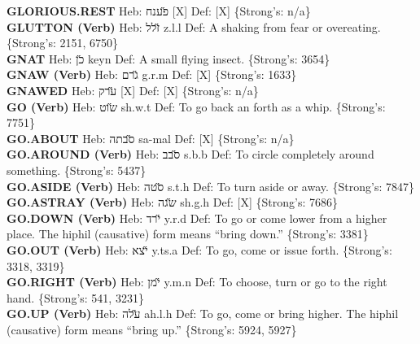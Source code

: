 {\textbf{GLORIOUS.REST} Heb: {\large\H פענח} {[}X{]} Def: {[}X{]} \{Strong's: n/a\}\hfill{}\\

\textbf{GLUTTON (Verb)} Heb: {\large\H זלל} z.l.l Def: A shaking from fear or overeating. \{Strong's: 2151, 6750\}\hfill{}\\

\textbf{GNAT} Heb: {\large\H כן} keyn Def: A small flying insect. \{Strong's: 3654\}\hfill{}\\

\textbf{GNAW (Verb)} Heb: {\large\H גרם} g.r.m Def: {[}X{]} \{Strong's: 1633\}\hfill{}\\

\textbf{GNAWED} Heb: {\large\H ערק} {[}X{]} Def: {[}X{]} \{Strong's: n/a\}\hfill{}\\

\textbf{GO (Verb)} Heb: {\large\H שוט} sh.w.t Def: To go back an forth as a whip. \{Strong's: 7751\}\hfill{}\\

\textbf{GO.ABOUT} Heb: {\large\H סבתה} sa-mal Def: {[}X{]} \{Strong's: n/a\}\hfill{}\\

\textbf{GO.AROUND (Verb)} Heb: {\large\H סבב} s.b.b Def: To circle completely around something. \{Strong's: 5437\}\hfill{}\\

\textbf{GO.ASIDE (Verb)} Heb: {\large\H סטה} s.t.h Def: To turn aside or away. \{Strong's: 7847\}\hfill{}\\

\textbf{GO.ASTRAY (Verb)} Heb: {\large\H שגה} sh.g.h Def: {[}X{]} \{Strong's: 7686\}\hfill{}\\

\textbf{GO.DOWN (Verb)} Heb: {\large\H ירד} y.r.d Def: To go or come lower from a higher place. The hiphil (causative) form means ``bring down.'' \{Strong's: 3381\}\hfill{}\\

\textbf{GO.OUT (Verb)} Heb: {\large\H יצא} y.ts.a Def: To go, come or issue forth. \{Strong's: 3318, 3319\}\hfill{}\\

\textbf{GO.RIGHT (Verb)} Heb: {\large\H ימן} y.m.n Def: To choose, turn or go to the right hand. \{Strong's: 541, 3231\}\hfill{}\\

\textbf{GO.UP (Verb)} Heb: {\large\H עלה} ah.l.h Def: To go, come or bring higher. The hiphil (causative) form means ``bring up.'' \{Strong's: 5924, 5927\}\hfill{}\\

}
